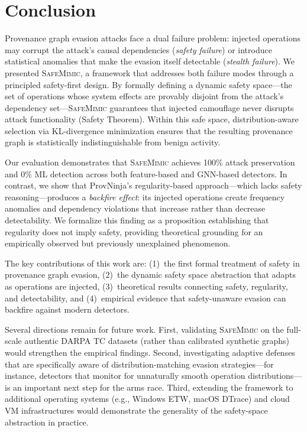 \section{Conclusion}
\label{sec:conclusion}

Provenance graph evasion attacks face a dual failure problem: injected operations may corrupt the attack's causal dependencies (\emph{safety failure}) or introduce statistical anomalies that make the evasion itself detectable (\emph{stealth failure}).
We presented \textsc{SafeMimic}, a framework that addresses both failure modes through a principled safety-first design.
By formally defining a dynamic safety space---the set of operations whose system effects are provably disjoint from the attack's dependency set---\textsc{SafeMimic} guarantees that injected camouflage never disrupts attack functionality (Safety Theorem).
Within this safe space, distribution-aware selection via KL-divergence minimization ensures that the resulting provenance graph is statistically indistinguishable from benign activity.

Our evaluation demonstrates that \textsc{SafeMimic} achieves 100\% attack preservation and 0\% ML detection across both feature-based and GNN-based detectors.
In contrast, we show that ProvNinja's regularity-based approach---which lacks safety reasoning---produces a \emph{backfire effect}: its injected operations create frequency anomalies and dependency violations that increase rather than decrease detectability.
We formalize this finding as a proposition establishing that regularity does not imply safety, providing theoretical grounding for an empirically observed but previously unexplained phenomenon.

The key contributions of this work are: (1)~the first formal treatment of safety in provenance graph evasion, (2)~the dynamic safety space abstraction that adapts as operations are injected, (3)~theoretical results connecting safety, regularity, and detectability, and (4)~empirical evidence that safety-unaware evasion can backfire against modern detectors.

Several directions remain for future work.
First, validating \textsc{SafeMimic} on the full-scale authentic DARPA TC datasets (rather than calibrated synthetic graphs) would strengthen the empirical findings.
Second, investigating adaptive defenses that are specifically aware of distribution-matching evasion strategies---for instance, detectors that monitor for unnaturally smooth operation distributions---is an important next step for the arms race.
Third, extending the framework to additional operating systems (e.g., Windows ETW, macOS DTrace) and cloud VM infrastructures would demonstrate the generality of the safety-space abstraction in practice.

